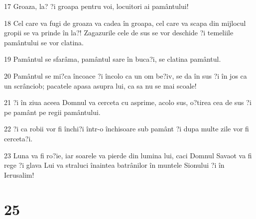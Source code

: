 \par 17 Groaza, la? ?i groapa pentru voi, locuitori ai pamântului!
\par 18 Cel care va fugi de groaza va cadea în groapa, cel care va scapa din mijlocul gropii se va prinde în la?! Zagazurile cele de sus se vor deschide ?i temeliile pamântului se vor clatina.
\par 19 Pamântul se sfarâma, pamântul sare în buca?i, se clatina pamântul.
\par 20 Pamântul se mi?ca încoace ?i încolo ca un om be?iv, se da în sus ?i în jos ca un scrânciob; pacatele apasa asupra lui, ca sa nu se mai scoale!
\par 21 ?i în ziua aceea Domnul va cerceta cu asprime, acolo sus, o?tirea cea de sus ?i pe pamânt pe regii pamântului.
\par 22 ?i ca robii vor fi închi?i într-o închisoare sub pamânt ?i dupa multe zile vor fi cerceta?i.
\par 23 Luna va fi ro?ie, iar soarele va pierde din lumina lui, caci Domnul Savaot va fi rege ?i glava Lui va straluci înaintea batrânilor în muntele Sionului ?i în Ierusalim!

\chapter{25}

